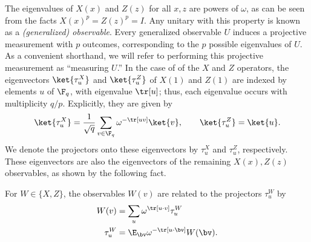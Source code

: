The eigenvalues of $X(x)$ and $Z(z)$ for
all $x, z$ are powers
of $\omega$, as can be seen from the facts $X(x)^p = Z(z)^p =
I$. Any unitary with this property is known as a \emph{(generalized)
  observable}. Every generalized observable $U$ induces a projective
measurement with $p$ outcomes, corresponding to the $p$ possible eigenvalues of
$U$. As a convenient shorthand, we will refer to performing this projective
measurement as ``measuring $U$.''  In the case of of the $X$ and $Z$
operators, the
eigenvectors $\ket{\tau^X_u}$ and $\ket{\tau^Z_u}$ of $X(1)$ and $Z(1)$ are indexed by elements $u$ of $\F_q$,
with eigenvalue $\tr[u]$; thus, each eigenvalue occurs with
multiplicity $q/p$. Explicitly, they are given by
\begin{equation}\label{eq:pauli-eigenstates}
  \ket{\tau^X_u} = \frac{1}{\sqrt{q}} \sum_{v \in \F_q}
  \omega^{-\tr[uv]} \ket{v},\qquad \ket{\tau^Z_u} = \ket{u}.
  \end{equation}
We denote the projectors onto these eigenvectors by $\tau^X_u$ and
$\tau^Z_u$, respectively. These eigenvectors are also the eigenvectors
of the remaining $X(x), Z(z)$ observables, as shown by the following fact.
\begin{fact}
  For $W \in \{X, Z\}$, the observables $W(v)$ are related to the
  projectors $\tau^W_u$ by
  \begin{align}
    W(v) &= \sum_{u} \omega^{\tr[u \cdot v]}
           \tau^W_u \label{eq:pauli-obs-to-proj} \\
    \tau^W_u &= \E_{\bv} \omega^{-\tr[u \cdot \bv]} W(\bv). \label{eq:pauli-proj-to-obs}
  \end{align}
\end{fact}
